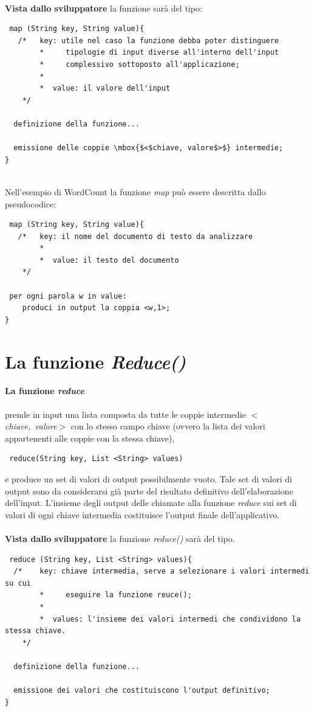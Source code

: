 \documentclass[a4paper,11pt]{report}
\begin{document}
\paragraph{}
\textbf{Vista dallo sviluppatore} la funzione sarà del tipo:
\begin{verbatim}
 map (String key, String value){
   /*	key: utile nel caso la funzione debba poter distinguere
	    *     tipologie di input diverse all'interno dell'input
	    *     complessivo sottoposto all'applicazione;
	    *
	    *  value: il valore dell'input 
    */

  definizione della funzione...

  emissione delle coppie \mbox{$<$chiave, valore$>$} intermedie;
}


\end{verbatim}
Nell'esempio di WordCount la funzione \emph{map} può essere descritta dallo pseudocodice:
\begin{verbatim}
 map (String key, String value){
   /*	key: il nome del documento di testo da analizzare
	    *
	    *  value: il testo del documento
    */

 per ogni parola w in value:
    produci in output la coppia <w,1>;
}
\end{verbatim}

  
\section{La funzione \emph{Reduce()}}
\paragraph{La funzione \emph{reduce}} prende in input una lista composta da tutte le coppie intermedie \emph{\mbox{$<$chiave, valore$>$}}
con lo stesso campo chiave (ovvero la lista dei valori appartenenti alle coppie con la stessa chiave),
\begin{verbatim}
 reduce(String key, List <String> values)
\end{verbatim}

e produce un set di valori di output possibilmente vuoto.
Tale set di valori di output sono da considerarsi già parte del risultato definitivo dell'elaborazione dell'input. L'insieme degli output
delle chiamate alla funzione \emph{reduce}
sui set di valori di ogni chiave intermedia costituisce l'output finale dell'applicativo.
\paragraph{}
\textbf{Vista dallo sviluppatore} la funzione \emph{reduce()} sarà del tipo.
\begin{verbatim}
 reduce (String key, List <String> values){
  /*	key: chiave intermedia, serve a selezionare i valori intermedi su cui
	    *     eseguire la funzione reuce();
	    *
	    *  values: l'insieme dei valori intermedi che condividono la stessa chiave.
    */

  definizione della funzione...

  emissione dei valori che costituiscono l'output definitivo;
}

\end{verbatim}
\end{document}
